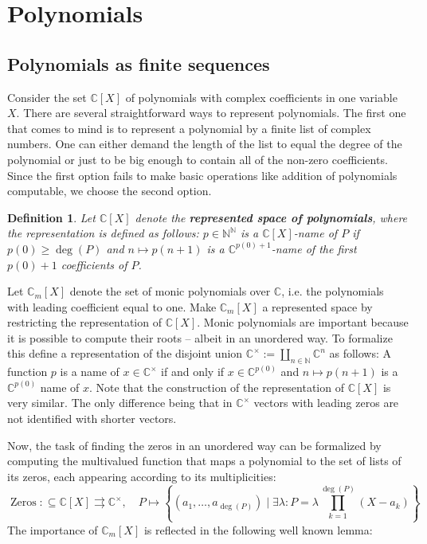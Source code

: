 \documentclass{eptcs-modified}
\newtheorem{definition}[theorem]{Definition}
\newcommand{\Baire}{{\mathbb{N}^\mathbb{N}}}
\newcommand{\mto}{\rightrightarrows}
\newcommand{\demph}{\textbf}
\newcommand{\CC}{\mathbb{C}}
\newcommand{\Zeros}{\operatorname{Zeros}}
\begin{document}
	\section{Polynomials}\label{sec:polynomials}
		\subsection{Polynomials as finite sequences}\label{sec:sub:polynomials as finite sequences}

			Consider the set $\CC[X]$ of polynomials with complex coefficients in one variable $X$.
			There are several straightforward ways to represent polynomials.
			The first one that comes to mind is to represent a polynomial by a finite list of complex numbers.
			One can either demand the length of the list to equal the degree of the polynomial or just to be big enough to contain all of the non-zero coefficients.
			Since the first option fails to make basic operations like addition of polynomials computable, we choose the second option.

			\begin{definition}
				Let $\CC[X]$ denote the \demph{represented space of polynomials}, where the representation is defined as follows: $p\in\Baire$ is a ${\CC[X]}$-name of $P$ if $p(0)\geq \deg(P)$ and $n\mapsto p(n+1)$ is a $\CC^{p(0)+1}$-name of the first $p(0)+1$ coefficients of $P$.
			\end{definition}

			Let $\CC_m[X]$ denote the set of monic polynomials over $\CC$, i.e. the polynomials with leading coefficient equal to one.
			Make $\CC_m[X]$ a represented space by restricting the representation of $\CC[X]$.
			Monic polynomials are important because it is possible to compute their roots -- albeit in an unordered way.
			To formalize this define a representation of the disjoint union $\mathbb{C}^\times := \coprod_{n \in \mathbb{N}} \CC^n$ as follows:
			A function $p$ is a name of $x\in \mathbb{C}^\times$ if and only if $x\in \CC^{p(0)}$ and $n\mapsto p(n+1)$ is a $\CC^{p(0)}$ name of $x$.
			Note that the construction of the representation of $\CC[X]$ is very similar.
			The only difference being that in $\mathbb{C}^\times$ vectors with leading zeros are not identified with shorter vectors.

			Now, the task of finding the zeros in an unordered way can be formalized by computing the multivalued function that maps a polynomial to the set of lists of its zeros, each appearing according to its multiplicities:
			\[ \Zeros: \subseteq \CC[X] \mto \CC^\times, \quad P \mapsto \left\{(a_1,\ldots,a_{\deg(P)})\mid \exists \lambda:P=\lambda\prod_{k=1}^{\deg(P)}(X-a_k)\right\} \]
			The importance of $\CC_m[X]$ is reflected in the following well known lemma:
\end{document}
